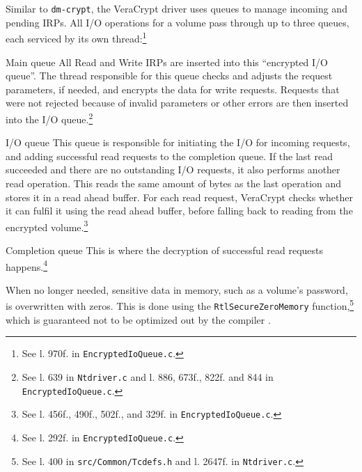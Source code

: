 Similar to \texttt{dm-crypt}, the VeraCrypt driver uses queues to manage incoming and pending IRPs. All I/O operations for a volume pass through up to three queues, each serviced by its own thread:\footnote{\label{fn:otherapproaches.veracrypt.queuecreation} See l. 970f. in \texttt{EncryptedIoQueue.c}.}
\begin{descitemize}
	\item[Main queue] All Read and Write IRPs are inserted into this ``encrypted I/O queue''. The thread responsible for this queue checks and adjusts the request parameters, if needed, and encrypts the data for write requests. Requests that were not rejected because of invalid parameters or other errors are then inserted into the I/O queue.\footnote{\label{fn:otherapproaches.veracrypt.mainqueue} See l. 639 in \texttt{Ntdriver.c} and l. 886, 673f., 822f. and 844 in \texttt{EncryptedIoQueue.c}.}
	\item[I/O queue] This queue is responsible for initiating the I/O for incoming requests, and adding successful read requests to the completion queue. If the last read succeeded and there are no outstanding I/O requests, it also performs another read operation. This reads the same amount of bytes as the last operation and stores it in a read ahead buffer. For each read request, VeraCrypt checks whether it can fulfil it using the read ahead buffer, before falling back to reading from the encrypted volume.\footnote{\label{fn:otherapproaches.veracrypt.ioqueue} See l. 456f., 490f., 502f., and 329f. in \texttt{EncryptedIoQueue.c}.}
	\item[Completion queue] This is where the decryption of successful read requests happens.\footnote{\label{fn:otherapproaches.veracrypt.completionqueue} See l. 292f. in \texttt{EncryptedIoQueue.c}.}
\end{descitemize}

When no longer needed, sensitive data in memory, such as a volume's password, is overwritten with zeros. This is done using the \texttt{RtlSecureZeroMemory} function,\footnote{\label{fn:otherapproaches.veracrypt.zeromem} See l. 400 in \texttt{src/Common/Tcdefs.h} and l. 2647f. in \texttt{Ntdriver.c}.} which is guaranteed not to be optimized out by the compiler \cite{Wdk}.
%

